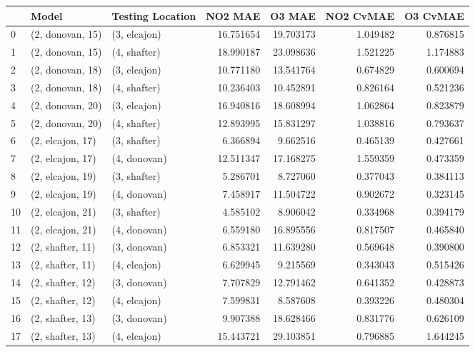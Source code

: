 \begin{tabular}{lllrrrr}
\toprule
{} &             Model & Testing Location &    NO2 MAE &     O3 MAE &  NO2 CvMAE &  O3 CvMAE \\
\midrule
0  &  (2, donovan, 15) &     (3, elcajon) &  16.751654 &  19.703173 &   1.049482 &  0.876815 \\
1  &  (2, donovan, 15) &     (4, shafter) &  18.990187 &  23.098636 &   1.521225 &  1.174883 \\
2  &  (2, donovan, 18) &     (3, elcajon) &  10.771180 &  13.541764 &   0.674829 &  0.600694 \\
3  &  (2, donovan, 18) &     (4, shafter) &  10.236403 &  10.452891 &   0.826164 &  0.521236 \\
4  &  (2, donovan, 20) &     (3, elcajon) &  16.940816 &  18.608994 &   1.062864 &  0.823879 \\
5  &  (2, donovan, 20) &     (4, shafter) &  12.893995 &  15.831297 &   1.038816 &  0.793637 \\
6  &  (2, elcajon, 17) &     (3, shafter) &   6.366894 &   9.662516 &   0.465139 &  0.427661 \\
7  &  (2, elcajon, 17) &     (4, donovan) &  12.511347 &  17.168275 &   1.559359 &  0.473359 \\
8  &  (2, elcajon, 19) &     (3, shafter) &   5.286701 &   8.727060 &   0.377043 &  0.384113 \\
9  &  (2, elcajon, 19) &     (4, donovan) &   7.458917 &  11.504722 &   0.902672 &  0.323145 \\
10 &  (2, elcajon, 21) &     (3, shafter) &   4.585102 &   8.906042 &   0.334968 &  0.394179 \\
11 &  (2, elcajon, 21) &     (4, donovan) &   6.559180 &  16.895556 &   0.817507 &  0.465840 \\
12 &  (2, shafter, 11) &     (3, donovan) &   6.853321 &  11.639280 &   0.569648 &  0.390800 \\
13 &  (2, shafter, 11) &     (4, elcajon) &   6.629945 &   9.215569 &   0.343043 &  0.515426 \\
14 &  (2, shafter, 12) &     (3, donovan) &   7.707829 &  12.791462 &   0.641352 &  0.428873 \\
15 &  (2, shafter, 12) &     (4, elcajon) &   7.599831 &   8.587608 &   0.393226 &  0.480304 \\
16 &  (2, shafter, 13) &     (3, donovan) &   9.907388 &  18.628466 &   0.831776 &  0.626109 \\
17 &  (2, shafter, 13) &     (4, elcajon) &  15.443721 &  29.103851 &   0.796885 &  1.644245 \\

\end{tabular}
